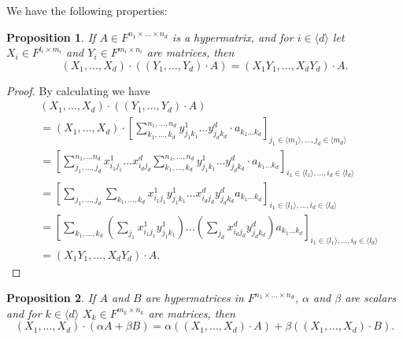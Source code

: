 \documentclass{report}
\newtheorem{prop}{Proposition}
\theoremstyle{definition}
\theoremstyle{remark}
\begin{document}
We have the following properties:

\begin{prop}
    If $A \in F^{n_1 \times \dots \times n_d}$ is a hypermatrix, and for $i \in \langle d \rangle$ let $X_i \in F^{l_i \times m_i}$ and $Y_i \in F^{m_i \times n_i}$ are matrices, then 
    \begin{equation*}
        (X_1,\dots,X_d)\cdot ((Y_1,\dots,Y_d)\cdot A) = (X_1 Y_1, \dots, X_d Y_d)\cdot A. 
    \end{equation*}
\end{prop}

\begin{proof}
    By calculating we have 
    \begin{equation*}
        \begin{split}
            & (X_1,\dots,X_d)\cdot ((Y_1,\dots,Y_d)\cdot A)  \\
            &  = (X_1,\dots,X_d) \cdot \left[ \sum_{k_1,\dots,k_d}^{n_1, \dots, n_d} y^1_{j_1 k_1} \dots y^d_{j_d k_d} \cdot a_{k_1 \dots k_d} \right]_{j_1\in \langle m_1 \rangle, \dots , j_d \in \langle m_d \rangle} \\
            & = \left[ \sum_{j_1, \dots, j_d}^{n_1, \dots n_d} x^1_{i_1 j_1} \dots x^d_{i_d j_d} \sum_{k_1 , \dots, k_d}^{n_1 ,\dots, n_d} y^1_{j_1 k_1} \dots y^d_{j_d k_d} \cdot a_{k_1 \dots k_d} \right]_{i_1 \in \langle l_1 \rangle, \dots , i_d \in \langle l_d \rangle} \\
            & = \left[ \sum_{j_1 , \dots, j_d } \sum_{k_1 , \dots, k_d} x^1_{i_1 j_1}y^1_{j_1 k_1} \dots x^d_{i_d j_d}y^d_{j_d k_d} a_{k_1 \dots k_d} \right]_{i_1 \in \langle l_1 \rangle, \dots , i_d \in \langle l_d \rangle} \\
            & = \left[ \sum_{k_1 , \dots, k_d} (\sum_{j_1} x^1_{i_1 j_1}y^1_{j_1 k_1}) \dots (\sum_{j_d} x^d_{i_d j_d}y^d_{j_d k_d}) a_{k_1 \dots k_d} \right]_{i_1 \in \langle l_1 \rangle, \dots , i_d \in \langle l_d \rangle} \\
            & = (X_1 Y_1,\dots ,X_d Y_d) \cdot A.
        \end{split}
    \end{equation*}
\end{proof}

\begin{prop}
    If $A$ and $B$ are hypermatrices in $F^{n_1 \times \dots \times n_d}$, $\alpha$ and $\beta$ are scalars and for $k \in \langle d \rangle$ $X_k \in F^{m_k \times n_k}$ are matrices, then 
   $$ (X_1 , \dots , X_d) \cdot (\alpha A + \beta B) = \alpha ((X_1, \dots, X_d) \cdot A) + \beta((X_1, \dots, X_d)\cdot B).$$ 
\end{prop}
\end{document}
